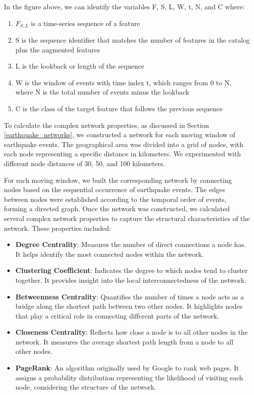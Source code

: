 \documentclass[sn-mathphys-num]{sn-jnl}
\begin{document}
In the figure above, we can identify the variables F, S, L, W, t, N, and C where:

\begin{enumerate}
    \item \( F_{S,L} \) is a time-series sequence of a feature
    \item S is the sequence identifier that matches the number of features in the catalog plus the augmented features
    \item L is the lookback or length of the sequence
    \item W is the window of events with time index t, which ranges from 0 to N, where N is the total number of events minus the lookback
    \item C is the class of the target feature that follows the previous sequence
\end{enumerate}


To calculate the complex network properties, as discussed in Section \ref{earthquake_networks}, we constructed a network for each moving window of earthquake events. The geographical area was divided into a grid of nodes, with each node representing a specific distance in kilometers. We experimented with different node distances of 30, 50, and 100 kilometers.

For each moving window, we built the corresponding network by connecting nodes based on the sequential occurrence of earthquake events. The edges between nodes were established according to the temporal order of events, forming a directed graph. Once the network was constructed, we calculated several complex network properties to capture the structural characteristics of the network. These properties included:

\begin{itemize}
    \item \textbf{Degree Centrality}: Measures the number of direct connections a node has. It helps identify the most connected nodes within the network.
    \item \textbf{Clustering Coefficient}: Indicates the degree to which nodes tend to cluster together. It provides insight into the local interconnectedness of the network.
    \item \textbf{Betweenness Centrality}: Quantifies the number of times a node acts as a bridge along the shortest path between two other nodes. It highlights nodes that play a critical role in connecting different parts of the network.
    \item \textbf{Closeness Centrality}: Reflects how close a node is to all other nodes in the network. It measures the average shortest path length from a node to all other nodes.
    \item \textbf{PageRank}: An algorithm originally used by Google to rank web pages. It assigns a probability distribution representing the likelihood of visiting each node, considering the structure of the network.
\end{itemize}
\end{document}
